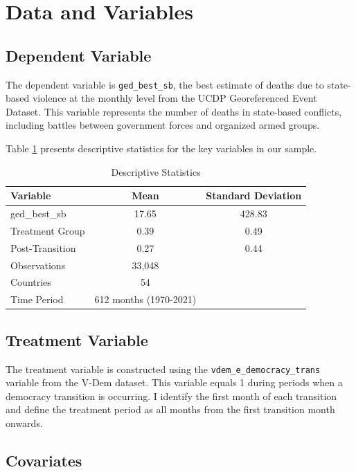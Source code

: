\documentclass[12pt]{article}
\begin{document}
\section{Data and Variables}

\subsection{Dependent Variable}

The dependent variable is \texttt{ged\_best\_sb}, the best estimate of deaths due to state-based violence at the monthly level from the UCDP Georeferenced Event Dataset. This variable represents the number of deaths in state-based conflicts, including battles between government forces and organized armed groups.

Table \ref{tab:descriptive} presents descriptive statistics for the key variables in our sample.

\begin{table}[htbp]
\centering
\caption{Descriptive Statistics}
\label{tab:descriptive}
\begin{tabular}{lcc}
\toprule
Variable & Mean & Standard Deviation \\
\midrule
ged\_best\_sb & 17.65 & 428.83 \\
Treatment Group & 0.39 & 0.49 \\
Post-Transition & 0.27 & 0.44 \\
\midrule
Observations & 33,048 & \\
Countries & 54 & \\
Time Period & 612 months (1970-2021) & \\
\bottomrule
\end{tabular}
\end{table}

\subsection{Treatment Variable}

The treatment variable is constructed using the \texttt{vdem\_e\_democracy\_trans} variable from the V-Dem dataset. This variable equals 1 during periods when a democracy transition is occurring. I identify the first month of each transition and define the treatment period as all months from the first transition month onwards.

\subsection{Covariates}
\end{document}

